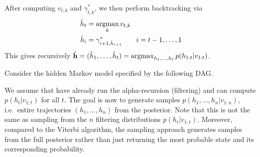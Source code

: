 \begin{solution}
After computing $v_{t,k}$ and $\gamma^*_{t,k}$, we then perform
backtracking via
\begin{align}
  \hat{h}_t & = \operatorname*{\mathrm{argmax}}_{k}   v_{t,k}\\
  \hat{h}_i & = \gamma^*_{i+1,\hat{h}_{i+1}} \quad \quad i=t-1, \ldots, 1
\end{align}
This gives recursively $\hat{\mathbf{h}} = (\hat{h}_1, \ldots, \hat{h}_t) = \operatorname*{\mathrm{argmax}}_{h_1, \ldots, h_t}  p(h_{1:t}|v_{1:t})$.

\end{solution}


\label{ex:FFBS}

Consider the hidden Markov model specified by the following DAG.

\begin{center}
\end{center}
We assume that have already run the alpha-recursion (filtering) and
can compute $p(h_t | v_{1:t})$ for all $t$. The goal is now to
generate samples $p(h_1, \ldots, h_n | v_{1:n})$, i.e.\ entire
trajectories $(h_1, \ldots, h_n)$ from the posterior. Note that this is
not the same as sampling from the $n$ filtering distributions $p(h_t |
v_{1:t})$. Moreover, compared to the Viterbi algorithm, the sampling approach
generates samples from the full posterior rather than just returning
the most probable state and its corresponding probability.

